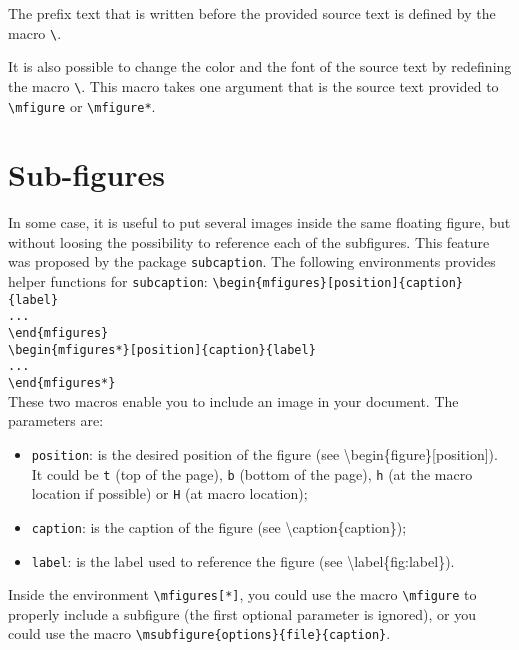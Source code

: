 \documentclass[book,taskpackage,specpackage,codepackage]{upmethodology-document}
\begin{document}
The prefix text that is written before the provided source text is defined by the macro \texttt{{\textbackslash}\figuresourcename}.

It is also possible to change the color and the font of the source text by redefining the macro \texttt{{\textbackslash}\mfigureformatsource[1]}. This macro takes one argument that is the source text provided to \texttt{{\textbackslash}mfigure} or \texttt{{\textbackslash}mfigure*}.

\section{Sub-figures}

In some case, it is useful to put several images inside the same floating figure, but without loosing the possibility to reference each of the subfigures. This feature was proposed by the package \texttt{subcaption}. The following environments provides helper functions for \texttt{subcaption}:
\texttt{{\textbackslash}begin\{mfigures\}[position]\{caption\}\{label\}\\
...\\
{\textbackslash}end\{mfigures\}} \\
\texttt{{\textbackslash}begin\{mfigures*\}[position]\{caption\}\{label\}\\
...\\
{\textbackslash}end\{mfigures*\}} \\

These two macros enable you to include an image in your document. The parameters are:
\begin{itemize}
\item \texttt{position}: is the desired position of the figure (see {\textbackslash}begin\{figure\}[position]). It could be \texttt{t} (top of the page), \texttt{b} (bottom of the page), \texttt{h} (at the macro location if possible) or \texttt{H} (at macro location);

\item \texttt{caption}: is the caption of the figure (see {\textbackslash}caption\{caption\});

\item \texttt{label}: is the label used to reference the figure (see {\textbackslash}label\{fig:label\}).
\end{itemize}

Inside the environment \texttt{{\textbackslash}mfigures[*]}, you could use the macro \texttt{{\textbackslash}mfigure} to properly include a subfigure (the first optional parameter is ignored), or you could use the macro \texttt{{\textbackslash}msubfigure\{options\}\{file\}\{caption\}}.
\end{document}
